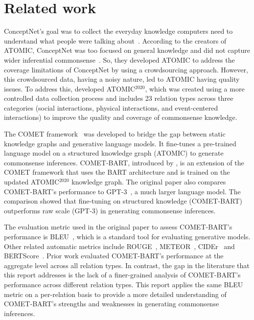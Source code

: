 \section{Related work}
\label{sec:relatedwork}


ConceptNet's goal was to collect the everyday knowledge computers need to understand what people were talking about~\cite{speer2012conceptnet, speer2017conceptnet}. According to the creators of ATOMIC, ConceptNet was too focused on general knowledge and did not capture wider inferential commonsense~\cite{sap2019atomic}. So, they developed ATOMIC to address the coverage limitations of ConceptNet by using a crowdsourcing approach. However, this crowdsourced data, having a noisy nature, led to ATOMIC having quality issues. To address this, \citet{hwang2021cometatomic} developed ATOMIC$^{2020}$, which was created using a more controlled data collection process and includes 23 relation types across three categories (social interactions, physical interactions, and event-centered interactions) to improve the quality and coverage of commonsense knowledge.


The COMET framework~\cite{bosselut-etal-2019-comet} was developed to bridge the gap between static knowledge graphs and generative language models. It fine-tunes a pre-trained language model on a structured knowledge graph (ATOMIC) to generate commonsense inferences. COMET-BART, introduced by \citet{hwang2021cometatomic}, is an extension of the COMET framework that uses the BART architecture and is trained on the updated ATOMIC$^{2020}$ knowledge graph. The original paper also compares COMET-BART's performance to GPT-3~\cite{brown2020language}, a much larger language model. The comparison showed that fine-tuning on structured knowledge (COMET-BART) outperforms raw scale (GPT-3) in generating commonsense inferences.



The evaluation metric used in the original paper to assess COMET-BART's performance is BLEU~\cite{papineni2002bleu}, which is a standard tool for evaluating generative models. Other related automatic metrics include ROUGE~\cite{lin2004rouge}, METEOR~\cite{banerjee2005meteor}, CIDEr~\cite{Vedantam2015CVPR} and BERTScore~\cite{zhang2019bertscore}. Prior work evaluated COMET-BART's performance at the aggregate level across all relation types. In contrast, the gap in the literature that this report addresses is the lack of a finer-grained analysis of COMET-BART's performance across different relation types. This report applies the same BLEU metric on a per-relation basis to provide a more detailed understanding of COMET-BART's strengths and weaknesses in generating commonsense inferences.
